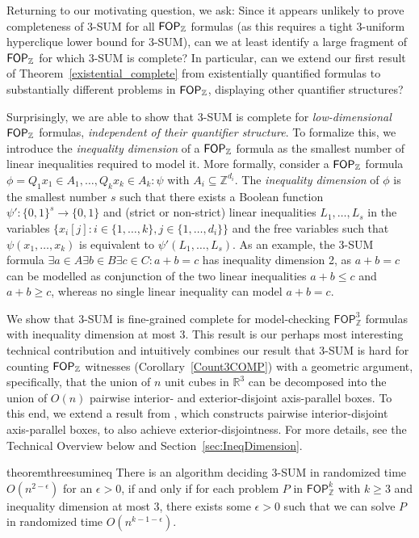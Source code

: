Returning to our motivating question, we ask: Since it appears unlikely to prove completeness of 3-SUM for all $\mathsf{FOP}_{\mathbb{Z}}$ formulas (as this requires a tight 3-uniform hyperclique lower bound for 3-SUM), can we at least identify a large fragment of $\mathsf{FOP}_{\mathbb{Z}}$ for which $3$-SUM is complete? In particular, can we extend our first result of Theorem~\ref{existential_complete} from existentially quantified formulas to substantially different problems in $\mathsf{FOP}_{\mathbb{Z}}$, displaying other quantifier structures?
 
Surprisingly, we are able to show that $3$-SUM is complete for \emph{low-dimensional} $\mathsf{FOP}_{\mathbb{Z}}$ formulas, \emph{independent of their quantifier structure}.
To formalize this, we introduce the \emph{inequality dimension} of a $\mathsf{FOP}_{\mathbb{Z}}$ formula as the smallest number of linear inequalities required to model it. More formally, consider a $\mathsf{FOP}_{\mathbb{Z}}$ formula $\phi = Q_1 x_1\in A_1, \dots, Q_k x_k\in A_k: \psi$ with $A_i\subseteq \mathbb{Z}^{d_i}$. The \emph{inequality dimension} of $\phi$ is the smallest number $s$ such that there exists a Boolean function $\psi' :\{0,1\}^s \to \{0,1\}$ and (strict or non-strict) linear inequalities $L_1, \dots, L_s$ in the variables $\{x_i[j] : i\in \{1,\dots,k\} ,j\in \{1,\dots,d_i\} \}$ and the free variables such that $\psi(x_1,\dots, x_k)$ is equivalent to $\psi'(L_1,\dots, L_s)$. As an example, the 3-SUM formula $\exists a\in A \exists b\in B\exists c\in C: a+b=c$ has inequality dimension 2, as $a+b=c$ can be modelled as conjunction of the two linear inequalities $a+b \le c$ and $a+b \ge c$, whereas no single linear inequality can model $a+b=c$.

We show that $3$-SUM is fine-grained complete for model-checking $\mathsf{FOP}^3_{\mathbb{Z}}$ formulas with inequality dimension at most $3$.
This result is our perhaps most interesting technical contribution and intuitively combines our result that $3$-SUM is hard for counting $\mathsf{FOP}_{\mathbb{Z}}$ witnesses (Corollary~\ref{Count3COMP}) with a geometric argument, specifically, that the union of $n$ unit cubes in $\mathbb{R}^3$ can be decomposed into the union of $O(n)$ pairwise interior- and exterior-disjoint axis-parallel boxes. To this end, we extend a result from \cite{DBLP:journals/dcg/ChewDEK99}, which constructs pairwise interior-disjoint axis-parallel boxes, to also achieve exterior-disjointness. For more details, see the Technical Overview below and Section~\ref{sec:IneqDimension}. 
\begin{restatable}[]{theorem}{threesumineq}
	There is an algorithm deciding $3$-SUM in randomized time $O(n^{2-\epsilon})$ for an $\epsilon>0$,
	if and only if for each problem $P$ in $\mathsf{FOP}^{k}_{\mathbb{Z}}$ with $k\geq 3$ and inequality dimension at most $3$, there exists some $\epsilon > 0$ such that we can solve $P$ in randomized time $O(n^{k-1-\epsilon})$.
	\label{three-sum-Completeness-all-quantifer}
\end{restatable}

